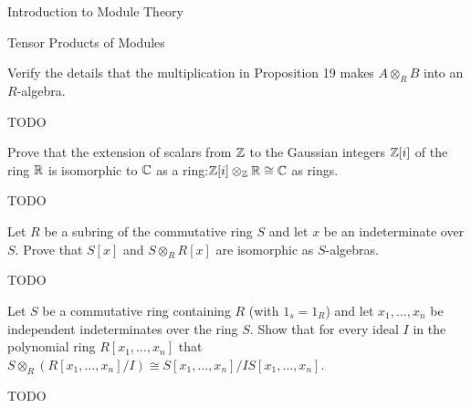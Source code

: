 \begin{chapter}{Introduction to Module Theory}
\begin{section}{Tensor Products of Modules}
\begin{solution}
\end{solution}\oneperpage



\begin{problem}\label{ex:10.4.23}
Verify the details that the multiplication in Proposition 19 makes $A\otimes_R B$ into an $R$-algebra.
\end{problem}
\begin{solution}TODO

\end{solution}\oneperpage



\begin{problem}\label{ex:10.4.24}
Prove that the extension of scalars from $\mathbb{Z}$ to the Gaussian integers $\mathbb{Z}[i]$ of the ring $\mathbb{R}$ is isomorphic to $\mathbb{C}$ as a ring:$\mathbb{Z}[i]\otimes_{\mathbb{Z}}\mathbb{R}\cong\mathbb{C}$ as rings. 
\end{problem}
\begin{solution}TODO

\end{solution}\oneperpage



\begin{problem}\label{ex:10.4.25}
Let $R$ be a subring of the commutative ring $S$ and let $x$ be an indeterminate over $S$. Prove that $S[x]$ and $S\otimes_RR[x]$ are isomorphic as $S$-algebras.
\end{problem}
\begin{solution}TODO

\end{solution}\oneperpage



\begin{problem}\label{ex:10.4.26}
Let $S$ be a commutative ring containing $R$ (with $1_s = 1_R$) and let $x_1,\ldots,x_n$ be independent indeterminates over the ring $S$. Show that for every ideal $I$ in the polynomial ring $R[x_1,\ldots,x_n]$ that $S\otimes_R(R[x_1,\ldots,x_n]/I)\cong S[x_1,\ldots,x_n]/IS[x_1,\ldots,x_n]$. 
\end{problem}
\begin{solution}TODO

\end{solution}\oneperpage




\end{section}
\end{chapter}
